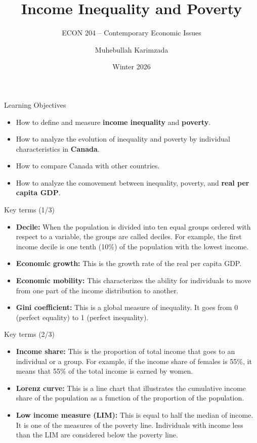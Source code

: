\documentclass[aspectratio=169]{beamer}
\title[Contemporary Economic Issues]{Income Inequality and Poverty}
\subtitle{ECON 204 -- Contemporary Economic Issues}
\author{Muhebullah Karimzada}
\date{Winter 2026}
\begin{document}
\begin{frame}
\transfade
\titlepage
\end{frame}



\begin{frame}{Learning Objectives}
\transfade
\begin{itemize}[<+->]
\item How to define and measure \textbf{income inequality} and \textbf{poverty}.
\item How to analyze the evolution of inequality and poverty by individual characteristics in \textbf{Canada}.
\item How to compare Canada with other countries.
\item How to analyze the comovement between inequality, poverty, and \textbf{real per capita GDP}.
\end{itemize}
\end{frame}

\begin{frame}{Key terms (1/3)}
\transfade
\begin{itemize}[<+->]
\item \textbf{Decile:} When the population is divided into ten equal groups ordered with respect to a variable, the groups are called deciles. For example, the first income decile is one tenth (10\%) of the population with the lowest income.\\

\item \textbf{Economic growth:} This is the growth rate of the real per capita GDP.\\

\item \textbf{Economic mobility:} This characterizes the ability for individuals to move from one part of the income distribution to another.\\

\item \textbf{Gini coefficient:} This is a global measure of inequality. It goes from 0 (perfect equality) to 1 (perfect inequality).
\end{itemize}
\end{frame}

\begin{frame}{Key terms (2/3)}
\transfade
\begin{itemize}[<+->]
\item \textbf{Income share:} This is the proportion of total income that goes to an individual or a group. For example, if the income share of females is 55\%, it means that 55\% of the total income is earned by women.
\item \textbf{Lorenz curve:} This is a line chart that illustrates the cumulative income share of the population as a function of the proportion of the population.
\item \textbf{Low income measure (LIM):} This is equal to half the median of income. It is one of the measures of the poverty line. Individuals with income less than the LIM are considered below the poverty line.

\end{itemize}
\end{frame}
\end{document}
